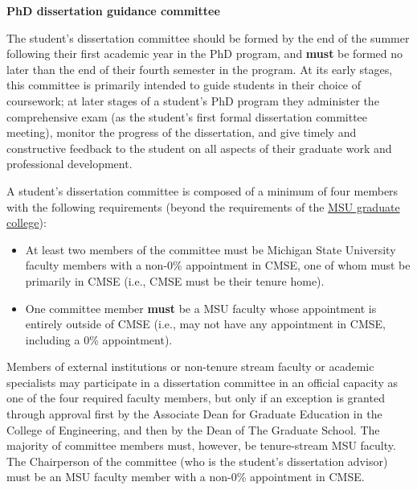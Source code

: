 \vspace{3mm}
\noindent
\textbf{PhD dissertation guidance committee}

The student's dissertation committee should be formed by the end of the
summer following their first academic year in the PhD program, and
\textbf{must} be formed no later than the end of their fourth semester
in the program. At its early stages, this committee is primarily
intended to guide students in their choice of coursework; at later
stages of a student's PhD program they administer the comprehensive
exam (as the student's first formal dissertation committee meeting), 
monitor the progress of the dissertation, and give timely and
constructive feedback to the student on all aspects of their graduate
work and professional development.

A student's dissertation committee is composed of a minimum of four
members with the following requirements (beyond the requirements of
the \href{https://hr.msu.edu/documents/facacadhandbooks/facultyhandbook/composition.htm}{MSU graduate
college}):

\begin{itemize}
\item At least two members of the committee must be Michigan State
  University faculty members with a non-0\% appointment in CMSE, one
  of whom must be primarily in CMSE (i.e., CMSE must be their tenure
  home).

\item One committee member \textbf{must} be a MSU faculty whose appointment
  is entirely outside of CMSE (i.e., may not have any appointment in
  CMSE, including a 0\% appointment).

\end{itemize}

Members of external institutions or non-tenure stream faculty or
academic specialists may participate in a dissertation committee in an
official capacity as one of the four required faculty members, but
only if an exception is granted through approval first by the
Associate Dean for Graduate Education in the College of Engineering,
and then by the Dean of The Graduate School.  The majority of
committee members must, however, be tenure-stream MSU faculty.  The
Chairperson of the committee (who is the student's dissertation
advisor) must be an MSU faculty member with a non-0\% appointment in
CMSE.

